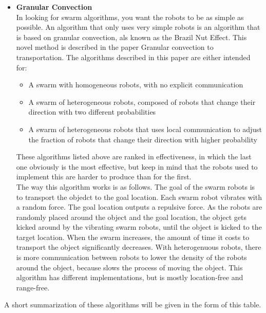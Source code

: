 \begin{itemize}
\item \textbf{Granular Convection}\\
In looking for swarm algorithms, you want the robots to be as simple as possible. An algorithm that only uses very simple robots is an algorithm that is based on granular convection, als known as the Brazil Nut Effect. This novel method is described in the paper Granular convection to transportation.\cite{Sugawara2012} The algorithms described in this paper are either intended for:

\begin{itemize}
	\item A swarm with homogeneous robots, with no explicit communication
	\item A swarm of heterogeneous robots, composed of robots that change their direction with two different probabilities
	\item A swarm of heterogeneous robots that uses local communication to adjust the fraction of robots that change their direction with higher probability
\end{itemize}

These algorithms listed above are ranked in effectiveness, in which the last one obviously is the most effective, but keep in mind that the robots used to implement this are harder to produce than for the first. \\ The way this algorithm works is as follows. The goal of the swarm robots is to transport the objedct to the goal location. Each swarm robot vibrates with a random force. The goal location outputs a repulsive force. As the robots are randomly placed around the object and the goal location, the object gets kicked around by the vibrating swarm robots, until the object is kicked to the target location. When the swarm increases, the amount of time it costs to transport the object significantly decreases. With heterogenuous robots, there is more communication between robots to lower the density of the robots around the object, because slows the process of moving the object.  This algorithm has different implementations, but is mostly location-free and  range-free. 
\end{itemize}

A short summarization of these algorithms will be given in the form of this table. 


